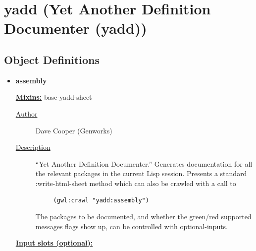 \documentclass [11pt]{book}
\begin{document}
\section{yadd (Yet Another Definition Documenter (yadd))}

\label{sec:yadd(yetanotherdefinitiondocumenter(yadd))}





\subsection{Object Definitions}



\begin{itemize}

\item {}
\label{prim:assembly}
\textbf{assembly}


\textbf{
\underline{Mixins:}} base-yadd-sheet





\begin{description}

\item [
\underline{Author}]


Dave Cooper (Genworks)



\item [
\underline{Description}]


``Yet Another Definition Documenter.'' Generates 
documentation for all the relevant packages in the current Lisp session. Presents a 
standard :write-html-sheet method which can also be crawled with a call to 

\begin{verbatim}
     (gwl:crawl "yadd:assembly")
\end{verbatim}

The packages to be documented, and whether the green/red supported 
messages flags show up, can be controlled with optional-inputs.



\end{description}








\textbf{
\underline{Input slots (optional):}}

\begin{description}


\end{description}
\end{itemize}
\end{document}
